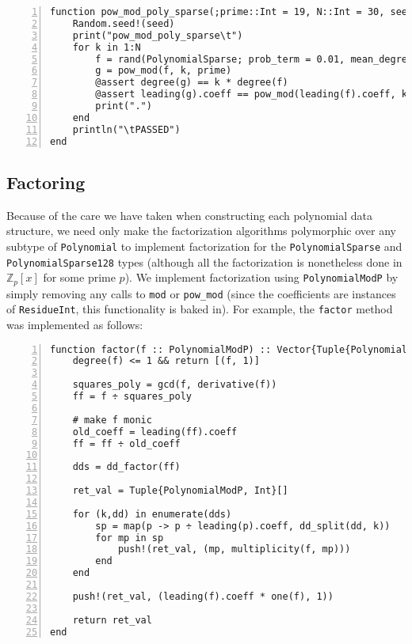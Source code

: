 \documentclass{article}
\theoremstyle{plain}
\numberwithin{theorem}{section}
\numberwithin{example}{section}
\theoremstyle{definition}
\numberwithin{definition}{section}
\begin{document}
\begin{codebox}
    \begin{Verbatim}[numbers=left,xleftmargin=5mm]
function pow_mod_poly_sparse(;prime::Int = 19, N::Int = 30, seed::Int = 0)
    Random.seed!(seed)
    print("pow_mod_poly_sparse\t")
    for k in 1:N
        f = rand(PolynomialSparse; prob_term = 0.01, mean_degree = Float64(120))
        g = pow_mod(f, k, prime)
        @assert degree(g) == k * degree(f)
        @assert leading(g).coeff == pow_mod(leading(f).coeff, k, prime)
        print(".")
    end
    println("\tPASSED")
end
    \end{Verbatim}
\end{codebox}

\bigbreak

\subsection{Factoring}
Because of the care we have taken when constructing each polynomial data
structure, we need only make the factorization algorithms polymorphic over any
subtype of \texttt{Polynomial} to implement factorization for the
\texttt{PolynomialSparse} and \texttt{PolynomialSparse128} types (although all
the factorization is nonetheless done in $\mathbb{Z}_p[x]$ for some prime $p$).
We implement factorization using \texttt{PolynomialModP} by simply removing any
calls to \texttt{mod} or \texttt{pow\_mod} (since the coefficients are instances
of \texttt{ResidueInt}, this functionality is baked in). For example, the
\texttt{factor} method was implemented as follows:

\begin{codebox}
    \begin{Verbatim}[numbers=left,xleftmargin=5mm]
function factor(f :: PolynomialModP) :: Vector{Tuple{PolynomialModP, Int}}
    degree(f) <= 1 && return [(f, 1)]

    squares_poly = gcd(f, derivative(f))
    ff = f ÷ squares_poly

    # make f monic
    old_coeff = leading(ff).coeff
    ff = ff ÷ old_coeff

    dds = dd_factor(ff)

    ret_val = Tuple{PolynomialModP, Int}[]

    for (k,dd) in enumerate(dds)
        sp = map(p -> p ÷ leading(p).coeff, dd_split(dd, k))
        for mp in sp
            push!(ret_val, (mp, multiplicity(f, mp)))
        end
    end

    push!(ret_val, (leading(f).coeff * one(f), 1))

    return ret_val
end
    \end{Verbatim}
\end{codebox}
\end{document}
